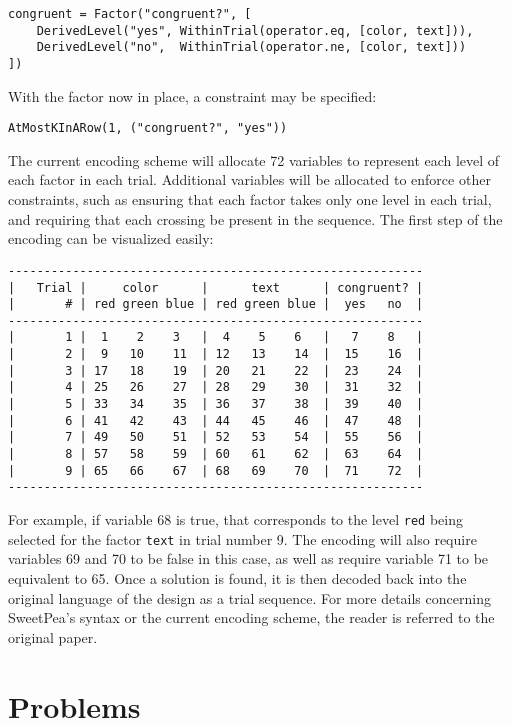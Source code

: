 \begin{verbatim}
congruent = Factor("congruent?", [
    DerivedLevel("yes", WithinTrial(operator.eq, [color, text])),
    DerivedLevel("no",  WithinTrial(operator.ne, [color, text]))
])
\end{verbatim}

With the factor now in place, a constraint may be specified:

\begin{verbatim}
AtMostKInARow(1, ("congruent?", "yes"))
\end{verbatim}

The current encoding scheme will allocate 72 variables to represent each level of each factor in each trial. Additional variables will be allocated to enforce other constraints, such as ensuring that each factor takes only one level in each trial, and requiring that each crossing be present in the sequence. The first step of the encoding can be visualized easily:

\begin{verbatim}
----------------------------------------------------------
|   Trial |     color      |      text      | congruent? |
|       # | red green blue | red green blue |  yes   no  |
----------------------------------------------------------
|       1 |  1    2    3   |  4    5    6   |   7    8   |
|       2 |  9   10    11  | 12   13    14  |  15    16  |
|       3 | 17   18    19  | 20   21    22  |  23    24  |
|       4 | 25   26    27  | 28   29    30  |  31    32  |
|       5 | 33   34    35  | 36   37    38  |  39    40  |
|       6 | 41   42    43  | 44   45    46  |  47    48  |
|       7 | 49   50    51  | 52   53    54  |  55    56  |
|       8 | 57   58    59  | 60   61    62  |  63    64  |
|       9 | 65   66    67  | 68   69    70  |  71    72  |
----------------------------------------------------------
\end{verbatim}

For example, if variable 68 is true, that corresponds to the level \texttt{red} being selected for the factor \texttt{text} in trial number 9. The encoding will also require variables 69 and 70 to be false in this case, as well as require variable 71 to be equivalent to 65. Once a solution is found, it is then decoded back into the original language of the design as a trial sequence. For more details concerning SweetPea's syntax or the current encoding scheme, the reader is referred to the original paper.


\section{Problems}

